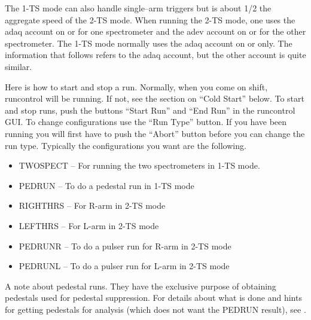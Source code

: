 {\par
The 1-TS mode can also handle single--arm
triggers but is about 1/2 the aggregate speed
of the 2-TS mode.  When running the 2-TS
mode, one uses the adaq account on  or   for one
spectrometer and the adev account on  or  
for the other spectrometer.  
The 1-TS mode normally uses the 
adaq account on  or   only.
The information that follows refers to 
the adaq account, but the other account is quite similar.

\par

Here is how to start and stop a run.
Normally, when you come on shift, 
runcontrol will be running.  If not,
see the section on ``Cold Start'' below.
To start and stop runs, push the buttons
``Start Run'' and ``End Run'' in the
runcontrol GUI.   To change configurations
use the ``Run Type'' button.  If you have
been running you will first have to push the
``Abort'' button before you can change the 
run type. Typically the configurations
you want are the following.

\begin{itemize} 
\item[~]TWOSPECT -- For running the two spectrometers in
1-TS mode.
\item[~]PEDRUN -- To do a pedestal run in 1-TS mode
\item[~]RIGHTHRS -- For R-arm in 2-TS mode
\item[~]LEFTHRS -- For L-arm in 2-TS mode
\item[~]PEDRUNR -- To do a pulser run for R-arm in 2-TS mode
\item[~]PEDRUNL -- To do a pulser run for L-arm in 2-TS mode
\end{itemize} 

\par 
A note about pedestal runs.  They have the exclusive
purpose of obtaining pedestals used for pedestal
suppression.  For details about what is done
and hints for getting pedestals for analysis (which
does not want the PEDRUN result), see .

}

